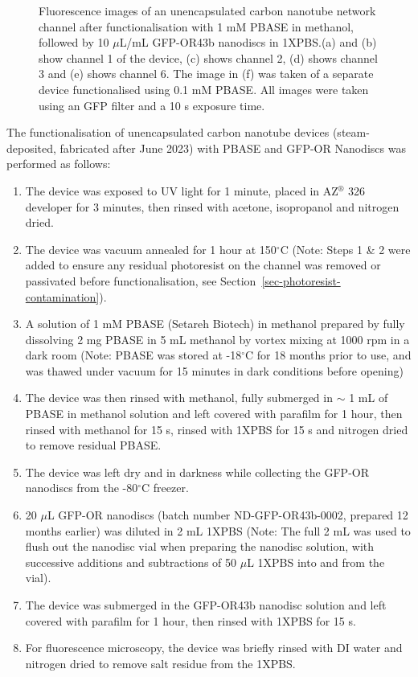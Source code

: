 \documentclass[
  a4paper,
]{scrbook}
\begin{document}
\begin{figure}
\begin{minipage}[t]{0.47\linewidth}
{{}

}

\subcaption{\label{fig-PBASE-GFP-OR-0.1mM}}
\end{minipage}%

\caption{\label{fig-PBASE-GFP-ORs}Fluorescence images of an
unencapsulated carbon nanotube network channel after functionalisation
with 1 mM PBASE in methanol, followed by 10 \(\mu\)L/mL GFP-OR43b
nanodiscs in 1XPBS.(a) and (b) show channel 1 of the device, (c) shows
channel 2, (d) shows channel 3 and (e) shows channel 6. The image in (f)
was taken of a separate device functionalised using 0.1 mM PBASE. All
images were taken using an GFP filter and a 10 s exposure time.}

\end{figure}

The functionalisation of unencapsulated carbon nanotube devices
(steam-deposited, fabricated after June 2023) with PBASE and GFP-OR
Nanodiscs was performed as follows:

\begin{enumerate}
\def\labelenumi{\arabic{enumi}.}
\item
  The device was exposed to UV light for 1 minute, placed in
  AZ\(^\circledR\) 326 developer for 3 minutes, then rinsed with
  acetone, isopropanol and nitrogen dried.
\item
  The device was vacuum annealed for 1 hour at 150\(^\circ\)C (Note:
  Steps 1 \& 2 were added to ensure any residual photoresist on the
  channel was removed or passivated before functionalisation, see
  Section~\ref{sec-photoresist-contamination}).
\item
  A solution of 1 mM PBASE (Setareh Biotech) in methanol prepared by
  fully dissolving 2 mg PBASE in 5 mL methanol by vortex mixing at 1000
  rpm in a dark room (Note: PBASE was stored at -18\(^\circ\)C for 18
  months prior to use, and was thawed under vacuum for 15 minutes in
  dark conditions before opening)
\item
  The device was then rinsed with methanol, fully submerged in \(\sim\)
  1 mL of PBASE in methanol solution and left covered with parafilm for
  1 hour, then rinsed with methanol for 15 s, rinsed with 1XPBS for 15 s
  and nitrogen dried to remove residual PBASE.
\item
  The device was left dry and in darkness while collecting the GFP-OR
  nanodiscs from the -80\(^\circ\)C freezer.
\item
  20 \(\mu\)L GFP-OR nanodiscs (batch number ND-GFP-OR43b-0002, prepared
  12 months earlier) was diluted in 2 mL 1XPBS (Note: The full 2 mL was
  used to flush out the nanodisc vial when preparing the nanodisc
  solution, with successive additions and subtractions of 50 \(\mu\)L
  1XPBS into and from the vial).
\item
  The device was submerged in the GFP-OR43b nanodisc solution and left
  covered with parafilm for 1 hour, then rinsed with 1XPBS for 15 s.
\item
  For fluorescence microscopy, the device was briefly rinsed with DI
  water and nitrogen dried to remove salt residue from the 1XPBS.
\end{enumerate}
\end{document}
